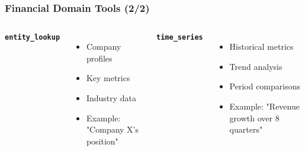 \begin{frame}
    \frametitle{Financial Domain Tools (2/2)}
    
    \begin{columns}
        \textbf{\texttt{entity\_lookup}}
        \begin{itemize}
            \item Company profiles
            \item Key metrics
            \item Industry data
            \item Example: "Company X's position"
        \end{itemize}
        
        \textbf{\texttt{time\_series}}
        \begin{itemize}
            \item Historical metrics
            \item Trend analysis
            \item Period comparisons
            \item Example: "Revenue growth over 8 quarters"
        \end{itemize}
    \end{columns}
    
    \vspace{0.3cm}
    \begin{center}
    \end{center}
\end{frame}

